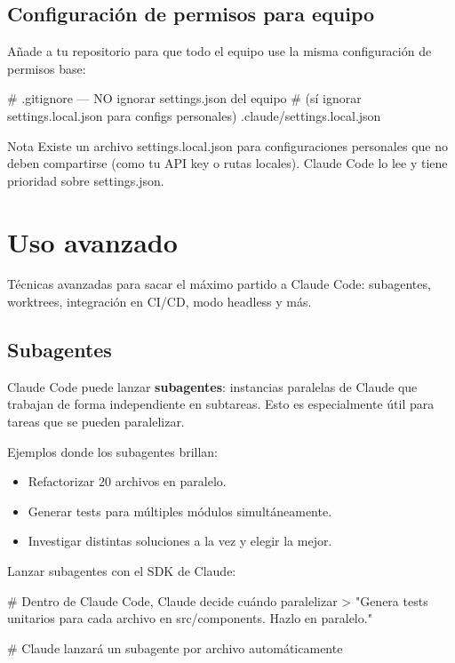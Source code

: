 \documentclass[11pt,a4paper]{report}
\DeclareRobustCommand{\texttt}[1]{{\ttfamily\seqsplit{#1}}}
\begin{document}
\section{Configuración de permisos para equipo}

Añade \texttt{.claude/settings.json} a tu repositorio para que todo el equipo use la misma configuración de permisos base:

\begin{codebox}
# .gitignore — NO ignorar settings.json del equipo
# (sí ignorar settings.local.json para configs personales)
.claude/settings.local.json
\end{codebox}

\begin{calloutbox}{Nota}
Existe un archivo settings.local.json para configuraciones personales que no deben compartirse (como tu API key o rutas locales). Claude Code lo lee y tiene prioridad sobre settings.json.\end{calloutbox}


\chapter{Uso avanzado}

Técnicas avanzadas para sacar el máximo partido a Claude Code: subagentes, worktrees, integración en CI/CD, modo headless y más.

\section{Subagentes}

Claude Code puede lanzar \textbf{subagentes}: instancias paralelas de Claude que trabajan de forma independiente en subtareas. Esto es especialmente útil para tareas que se pueden paralelizar.

Ejemplos donde los subagentes brillan:

\begin{itemize}
\item Refactorizar 20 archivos en paralelo.
\item Generar tests para múltiples módulos simultáneamente.
\item Investigar distintas soluciones a la vez y elegir la mejor.
\end{itemize}

Lanzar subagentes con el SDK de Claude:

\begin{codebox}
# Dentro de Claude Code, Claude decide cuándo paralelizar
> "Genera tests unitarios para cada archivo en src/components. Hazlo en paralelo."

# Claude lanzará un subagente por archivo automáticamente
\end{codebox}
\end{document}

